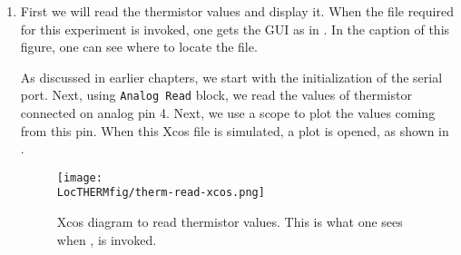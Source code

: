 \begin{enumerate}
  \item First we will read the thermistor values and display it.  When the
        file required for this experiment is invoked, one gets the GUI as in
        .  In the caption of this figure, one
        can see where to locate the file.

        As discussed in earlier chapters, we start with the initialization
        of the serial port. Next, using {\tt Analog Read} block, we read
        the values of thermistor connected on analog pin 4.
        Next, we use a scope to plot the values
        coming from this pin. When this Xcos file is simulated,
        a plot is opened, as shown in .

        \begin{figure}
          \centering
          \texttt{[image: \\LocTHERMfig/therm-read-xcos.png]}
          \caption[Xcos diagram to read thermistor values]{Xcos diagram to
            read thermistor values.  This is what one sees when
            , is invoked.}
          \label{fig:therm-read}
        \end{figure}


\end{enumerate}
